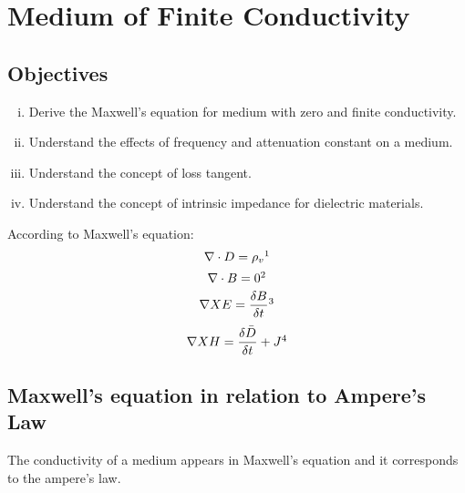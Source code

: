 \chapter{Medium of Finite Conductivity}\label{lec:lec25}

\begin{mdframed}[backgroundcolor=lightblue, linewidth=1pt,  hidealllines=true]
\section{Objectives}
\begin{enumerate}[(i)]
\item Derive the Maxwell's equation for medium with zero and finite conductivity.
\item Understand the effects of frequency and attenuation constant on a medium.
\item Understand the concept of loss tangent.
\item Understand the concept of intrinsic impedance for dielectric materials.
\end{enumerate}
\end{mdframed}

According to Maxwell's equation:
\begin{equation}
\nabla\cdot D = \rho_{v}\footnotemark
\end{equation}
\begin{equation}	 
\nabla\cdot B = 0\footnotemark
\end{equation}
\begin{equation}
\nabla X E = \frac{\delta B}{\delta t}\footnotemark
\end{equation}
\begin{equation}
\nabla XH =\frac{\delta \bar{D}}{\delta t} + J\footnotemark
\end{equation}
\section{Maxwell's equation in relation to Ampere's Law}
The conductivity of a medium appears in Maxwell's equation and it corresponds to the ampere's law.


